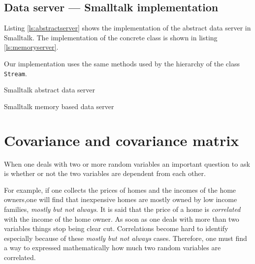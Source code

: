 
\subsection{Data server --- Smalltalk implementation}
\label{sec:sdataserver} Listing \ref{ls:abstractserver} shows the
implementation of the abstract data server in Smalltalk. The
implementation of the concrete class is shown in listing
\ref{ls:memoryserver}.

\noindent Our implementation uses the same methods used by the
hierarchy of the class \texttt{Stream}.

\begin{listing} Smalltalk abstract data server \label{ls:abstractserver}

\end{listing}
\begin{listing} Smalltalk memory based data server \label{ls:memoryserver}

\end{listing}

\section{Covariance and covariance matrix}
\label{sec:covmatrix} When one deals with two or more random
variables an important question to ask is whether or not the two
variables are dependent from each other.

For example, if one collects the prices of homes and the incomes
of the home owners,one will find that inexpensive homes are mostly
owned by low income families, \textsl{mostly but not always}. It is
said that the price of a home is \textsl{correlated} with the income
of the home owner. As soon as one deals with more than two
variables things stop being clear cut. Correlations become hard to
identify especially because of these \textsl{mostly but not always}
cases. Therefore, one must find a way to expressed mathematically
how much two random variables are correlated.

